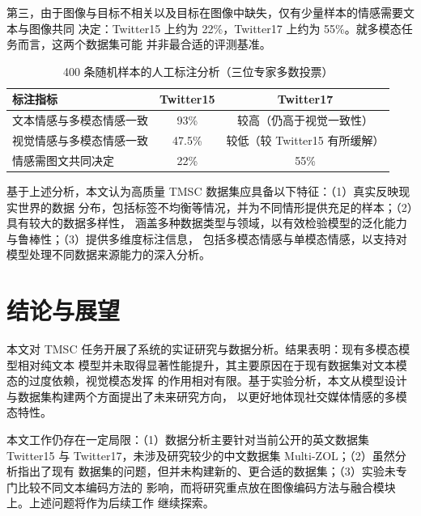 \documentclass[12pt]{ctexart}
\begin{document}
第三，由于图像与目标不相关以及目标在图像中缺失，仅有少量样本的情感需要文本与图像共同
决定：Twitter15 上约为 22\%，Twitter17 上约为 55\%。就多模态任务而言，这两个数据集可能
并非最合适的评测基准\cite{ye2023}。

\begin{table}[htbp]
\centering
\caption{400 条随机样本的人工标注分析（三位专家多数投票）\cite{ye2023}}
\label{tab:anno}
\small
\begin{tabular}{lcc}
\toprule
标注指标 & Twitter15 & Twitter17 \\
\midrule
文本情感与多模态情感一致 & 93\% & 较高（仍高于视觉一致性） \\
视觉情感与多模态情感一致 & 47.5\% & 较低（较 Twitter15 有所缓解） \\
情感需图文共同决定 & 22\% & 55\% \\
\bottomrule
\end{tabular}
\end{table}

基于上述分析，本文认为高质量 TMSC 数据集应具备以下特征：（1）真实反映现实世界的数据
分布，包括标签不均衡等情况，并为不同情形提供充足的样本；（2）具有较大的数据多样性，
涵盖多种数据类型与领域，以有效检验模型的泛化能力与鲁棒性；（3）提供多维度标注信息，
包括多模态情感与单模态情感，以支持对模型处理不同数据来源能力的深入分析\cite{ye2023}。

\clearpage
\section{结论与展望}
本文对 TMSC 任务开展了系统的实证研究与数据分析。结果表明：现有多模态模型相对纯文本
模型并未取得显著性能提升，其主要原因在于现有数据集对文本模态的过度依赖，视觉模态发挥
的作用相对有限。基于实验分析，本文从模型设计与数据集构建两个方面提出了未来研究方向，
以更好地体现社交媒体情感的多模态特性。

本文工作仍存在一定局限：（1）数据分析主要针对当前公开的英文数据集 Twitter15 与
Twitter17，未涉及研究较少的中文数据集 Multi-ZOL\cite{xu2019}；（2）虽然分析指出了现有
数据集的问题，但并未构建新的、更合适的数据集；（3）实验未专门比较不同文本编码方法的
影响，而将研究重点放在图像编码方法与融合模块上\cite{ye2023}。上述问题将作为后续工作
继续探索。
\end{document}

